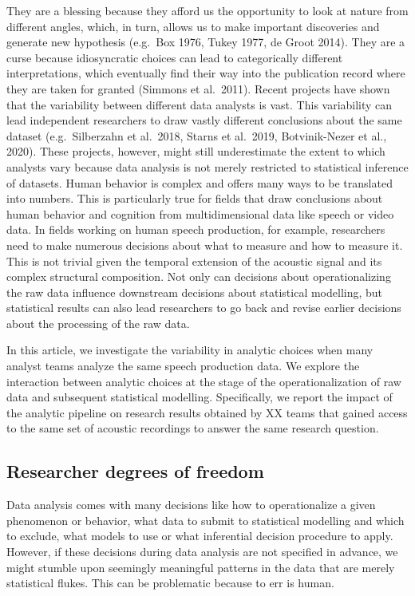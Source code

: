 \documentclass[
  english,
  man]{apa6}
\begin{document}
They are a blessing because they afford us the opportunity to look at nature from different angles, which, in turn, allows us to make important discoveries and generate new hypothesis (e.g.~Box 1976, Tukey 1977, de Groot 2014).
They are a curse because idiosyncratic choices can lead to categorically different interpretations, which eventually find their way into the publication record where they are taken for granted (Simmons et al.~2011).
Recent projects have shown that the variability between different data analysts is vast.
This variability can lead independent researchers to draw vastly different conclusions about the same dataset (e.g.~Silberzahn et al.~2018, Starns et al.~2019, Botvinik-Nezer et al., 2020).
These projects, however, might still underestimate the extent to which analysts vary because data analysis is not merely restricted to statistical inference of datasets.
Human behavior is complex and offers many ways to be translated into numbers.
This is particularly true for fields that draw conclusions about human behavior and cognition from multidimensional data like speech or video data.
In fields working on human speech production, for example, researchers need to make numerous decisions about what to measure and how to measure it.
This is not trivial given the temporal extension of the acoustic signal and its complex structural composition.
Not only can decisions about operationalizing the raw data influence downstream decisions about statistical modelling, but statistical results can also lead researchers to go back and revise earlier decisions about the processing of the raw data.

In this article, we investigate the variability in analytic choices when many analyst teams analyze the same speech production data.
We explore the interaction between analytic choices at the stage of the operationalization of raw data and subsequent statistical modelling.
Specifically, we report the impact of the analytic pipeline on research results obtained by XX teams that gained access to the same set of acoustic recordings to answer the same research question.

\hypertarget{researcher-degrees-of-freedom}{%
\subsection{Researcher degrees of freedom}\label{researcher-degrees-of-freedom}}

Data analysis comes with many decisions like how to operationalize a given phenomenon or behavior, what data to submit to statistical modelling and which to exclude, what models to use or what inferential decision procedure to apply.
However, if these decisions during data analysis are not specified in advance, we might stumble upon seemingly meaningful patterns in the data that are merely statistical flukes.
This can be problematic because to err is human.
\end{document}
